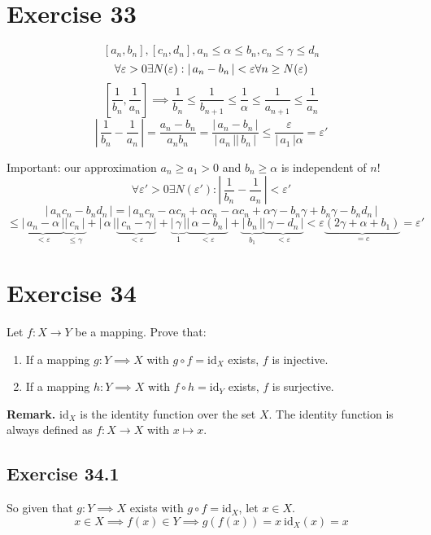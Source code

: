 \documentclass[a4paper]{article}
\theoremstyle{definition}
\newcommand\abs[1]{\left|\thinspace #1\thinspace\right|}
\newcommand\card[1]{\left|\,#1\,\right|}
\begin{document}
\section{Exercise 33}

\[ [a_n, b_n], [c_n, d_n], a_n \leq \alpha \leq b_n, c_n \leq \gamma \leq d_n \]
\[ \forall \varepsilon > 0 \exists N(\varepsilon): \abs{a_n - b_n} < \varepsilon \forall n \geq N(\varepsilon) \]
\[
    \left[\frac{1}{b_n}, \frac{1}{a_n}\right] \implies \frac{1}{b_n} \leq \frac{1}{b_{n+1}} \leq \frac{1}{\alpha} \leq \frac{1}{a_{n+1}} \leq \frac{1}{a_n}
\] \[
  \card{\frac{1}{b_n} - \frac{1}{a_n}}
  = \frac{a_n - b_n}{a_n b_n}
  = \frac{\card{a_n - b_n}}{\card{a_n}\card{b_n}} \leq \frac{\varepsilon}{\card{a_1} \alpha}
  = \varepsilon'
\]

Important: our approximation $a_n \geq a_1 > 0$ and $b_n \geq \alpha$ is independent of $n$!
\[
  \forall \varepsilon' > 0 \exists N(\varepsilon'): \card{\frac1{b_n} - \frac1{a_n}} < \varepsilon'
\] \[
  \card{a_n c_n - b_n d_n} = \card{a_n c_n - \alpha c_n + \alpha c_n - \alpha c_n + \alpha \gamma - b_n \gamma + b_n \gamma - b_n d_n}
\] \[
  \leq \underbrace{\card{a_n - \alpha}}_{<\varepsilon} \underbrace{\card{c_n}}_{\leq \gamma} + \card{\alpha} \underbrace{\card{c_n - \gamma}}_{<\varepsilon} + \underbrace{\card{\gamma}}_{1} \underbrace{\card{\alpha - b_n}}_{<\varepsilon} + \underbrace{\card{b_n}}_{b_1} \underbrace{\card{\gamma - d_n}}_{<\varepsilon} < \varepsilon\underbrace{(2\gamma + \alpha + b_1)}_{=c} = \varepsilon'
\]

\section{Exercise 34}

\begin{ex}
  Let $f: X \to Y$ be a mapping. Prove that:
  \begin{enumerate}
    \item If a mapping $g: Y \implies X$ with $g \circ f = \text{id}_X$ exists, $f$ is injective.
    \item If a mapping $h: Y \implies X$ with $f \circ h = \text{id}_Y$ exists, $f$ is surjective.
  \end{enumerate}
  \textbf{Remark.} $\text{id}_X$ is the identity function over the set $X$.
    The identity function is always defined as $f: X \to X$ with $x \mapsto x$.
\end{ex}

\subsection{Exercise 34.1}
%
So given that $g: Y \implies X$ exists with $g \circ f = \text{id}_X$,
let $x \in X$.
\[ x \in X \implies f(x) \in Y \implies g(f(x)) = x \ \text{id}_X(x) = x \]
\end{document}
